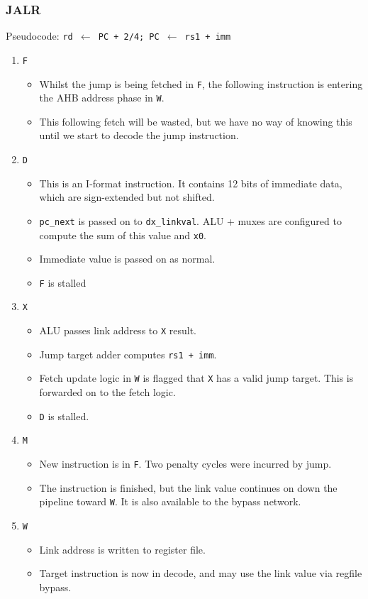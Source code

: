 \documentclass{article}
\begin{document}
\subsubsection{JALR}

Pseudocode: \texttt{rd $\leftarrow$ PC + 2/4; PC $\leftarrow$ rs1 + imm}


\begin{enumerate}
	\item \texttt{F}
	\begin{itemize}
		\item Whilst the jump is being fetched in \texttt{F}, the following instruction is entering the AHB address phase in \texttt{W}.
		\item This following fetch will be wasted, but we have no way of knowing this until we start to decode the jump instruction.
	\end{itemize}
	\item \texttt{D}
	\begin{itemize}
		\item This is an I-format instruction. It contains 12 bits of immediate data, which are sign-extended but not shifted.
		\item \texttt{pc\_next} is passed on to \texttt{dx\_linkval}. ALU + muxes are configured to compute the sum of this value and \texttt{x0}.
		\item Immediate value is passed on as normal.
		\item \texttt{F} is stalled
	\end{itemize}
	\item \texttt{X}
	\begin{itemize}
		\item ALU passes link address to \texttt{X} result.
		\item Jump target adder computes \texttt{rs1 + imm}.
		\item Fetch update logic in \texttt{W} is flagged that \texttt{X} has a valid jump target. This is forwarded on to the fetch logic.
		\item \texttt{D} is stalled.
	\end{itemize}
	\item \texttt{M}
	\begin{itemize}
		\item New instruction is in \texttt{F}. Two penalty cycles were incurred by jump.
		\item The instruction is finished, but the link value continues on down the pipeline toward \texttt{W}. It is also available to the bypass network.
	\end{itemize}
	\item \texttt{W}
	\begin{itemize}
		\item Link address is written to register file.
		\item Target instruction is now in decode, and may use the link value via regfile bypass.
	\end{itemize}
\end{enumerate}
\end{document}
